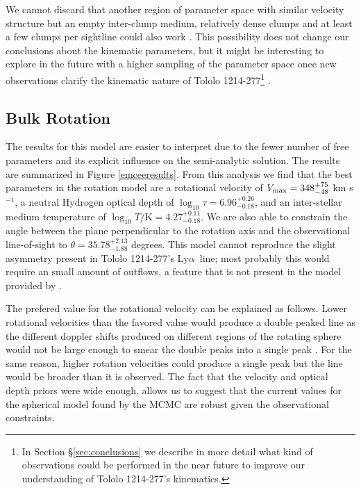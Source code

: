 \documentclass[a4,useAMS,usenatbib,usegraphicx]{mn2e}
\newcommand{\tol}{Tololo 1214-277}
\newcommand{\lya}{Ly$\alpha$}
\newcommand{\kms}{km s$^{-1}$}
\begin{document}
We cannot discard that another region of parameter space with similar
velocity structure but an empty inter-clump medium, relatively dense
clumps and at least a few clumps per sightline 
could also work \citep{Hansen06}.
This possibility does not change our conclusions about the
kinematic parameters, but it might be interesting to explore in the
future with a higher sampling of the parameter space once new 
observations  clarify the kinematic nature of \tol \footnote{In
  Section \S \ref{sec:conclusions} we describe  in more detail what
  kind of observations could be performed in the near future to
  improve our understanding of \tol's kinematics.} . 
  

\subsection{Bulk Rotation}

The results for this model are easier to interpret due to the fewer
number of free parameters and its explicit influence on the
semi-analytic solution.
The results are summarized in  Figure \ref{emceeresults}. 
From this analysis we find that the best parameters in the rotation
model are a rotational velocity of  $V_{\rm max}=348^{+75}_{-48}$
\kms, a neutral Hydrogen optical depth of
$\log_{10}\tau=6.96^{+0.26}_{-0.18}$,  and an inter-stellar medium
temperature of $\log_{10} T/\mathrm {K} = 4.27^{+0.11}_{-0.18}$.   
We are also able to constrain the angle between the plane
perpendicular to the rotation axis and the observational line-of-sight
to $\theta = 35.78^{+2.13}_{-1.88}$ degrees.
This model cannot reproduce the slight asymmetry present in \tol's
\lya\ line; most probably this would require an small amount of
outflows, a feature that is not present in the model provided by
\cite{GaravitoCamargo2014}. 

The prefered value for the rotational velocity can be explained as
follows. 
Lower rotational velocities than the favored value would produce a
double peaked line as the different doppler shifts produced on
different regions of the rotating sphere would not be large enough to
smear the double peaks into a single peak
\citep{GaravitoCamargo2014}. 
For the same reason, higher rotation velocities could produce a single
peak but the line would be broader than it is observed.
The fact that the velocity and optical depth priors were wide enough,
allows us to suggest that the current values for the spherical model
found by the MCMC are robust given the observational constraints.
\end{document}
